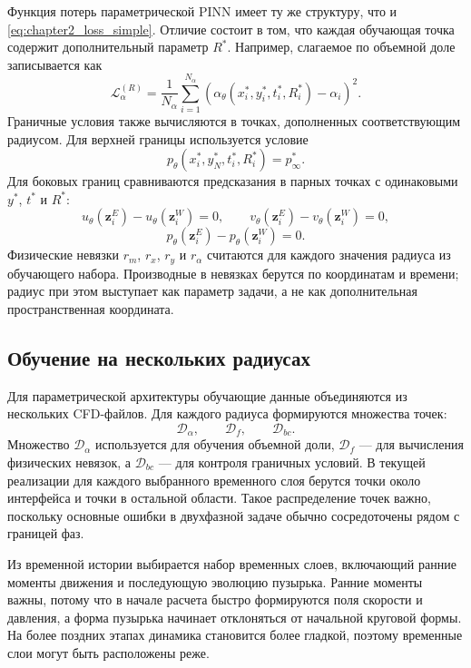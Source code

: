 Функция потерь параметрической PINN имеет ту же структуру, что и
\eqref{eq:chapter2_loss_simple}. Отличие состоит в том, что каждая обучающая
точка содержит дополнительный параметр \(R^*\). Например, слагаемое по объемной
доле записывается как
\begin{equation}
    \mathcal{L}_{\alpha}^{(R)}
    =
    \frac{1}{N_\alpha}
    \sum_{i=1}^{N_\alpha}
    \left(
        \alpha_\theta(x_i^*,y_i^*,t_i^*,R_i^*)-\alpha_i
    \right)^2.
\end{equation}
Граничные условия также вычисляются в точках, дополненных соответствующим
радиусом. Для верхней границы используется условие
\[
    p_\theta(x_i^*,y_N^*,t_i^*,R_i^*)=p_\infty^*.
\]
Для боковых границ сравниваются предсказания в парных точках с одинаковыми
\(y^*\), \(t^*\) и \(R^*\):
\[
    u_\theta(\mathbf{z}_i^E)-u_\theta(\mathbf{z}_i^W)=0,
    \qquad
    v_\theta(\mathbf{z}_i^E)-v_\theta(\mathbf{z}_i^W)=0,
\]
\[
    p_\theta(\mathbf{z}_i^E)-p_\theta(\mathbf{z}_i^W)=0.
\]
Физические невязки \(r_m\), \(r_x\), \(r_y\) и \(r_\alpha\) считаются для
каждого значения радиуса из обучающего набора. Производные в невязках берутся
по координатам и времени; радиус при этом выступает как параметр задачи, а не
как дополнительная пространственная координата.

\subsection{Обучение на нескольких радиусах}

Для параметрической архитектуры обучающие данные объединяются из нескольких
CFD-файлов. Для каждого радиуса формируются множества точек:
\[
    \mathcal{D}_\alpha,\qquad
    \mathcal{D}_f,\qquad
    \mathcal{D}_{bc}.
\]
Множество \(\mathcal{D}_\alpha\) используется для обучения объемной доли,
\(\mathcal{D}_f\) --- для вычисления физических невязок, а
\(\mathcal{D}_{bc}\) --- для контроля граничных условий. В текущей реализации
для каждого выбранного временного слоя берутся точки около интерфейса и точки в
остальной области. Такое распределение точек важно, поскольку основные ошибки
в двухфазной задаче обычно сосредоточены рядом с границей фаз.

Из временной истории выбирается набор временных слоев, включающий ранние
моменты движения и последующую эволюцию пузырька. Ранние моменты важны, потому
что в начале расчета быстро формируются поля скорости и давления, а форма
пузырька начинает отклоняться от начальной круговой формы. На более поздних
этапах динамика становится более гладкой, поэтому временные слои могут быть
расположены реже.

